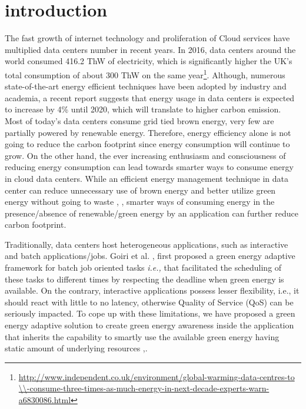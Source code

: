 \section{introduction}


The fast growth of internet technology and proliferation of Cloud services have multiplied data centers number in recent years. In 2016, data centers around the world consumed 416.2 ThW of electricity, which is significantly higher the UK's total consumption of about 300 ThW on the same year\footnote{\url{http://www.independent.co.uk/environment/global-warming-data-centres-to \\-consume-three-times-as-much-energy-in-next-decade-experts-warn-a6830086.html}}. Although, numerous state-of-the-art energy efficient techniques have been adopted by industry and academia, a recent report suggests that energy usage in data centers is expected to increase by 4\% until 2020, which will translate to higher carbon emission. Most of today's data centers consume grid tied brown energy, very few are partially powered by renewable energy. Therefore, energy efficiency alone is not going to reduce the
carbon footprint since energy consumption will continue to grow.
On the other hand, the ever increasing enthusiasm and consciousness of reducing energy consumption can lead towards smarter ways to consume energy in cloud data centers. While an efficient energy management technique in data center can reduce unnecessary use of brown energy and better utilize green energy without going to waste \cite{parasol}, \cite{sabbir}, smarter ways of consuming energy in the presence/absence of renewable/green energy by an application can further reduce carbon footprint.

 


Traditionally, data centers host heterogeneous applications, such as interactive and batch applications/jobs. Goiri et al. \cite{GreenSlot}, \cite{GreenHadoop} first proposed a green energy adaptive framework for batch job oriented tasks \emph{i.e.,} that facilitated the scheduling of these tasks to different times by respecting the deadline when green energy is available. On the contrary, interactive
applications possess lesser flexibility, i.e., it should react with
little to no latency, otherwise Quality of Service (QoS) can
be seriously impacted. To cope up with these limitations, we have proposed a green energy adaptive solution to create green energy awareness inside the application that inherits the capability to smartly use the available green energy having static amount of underlying resources \cite{cloudcom},\cite{tsc}.

